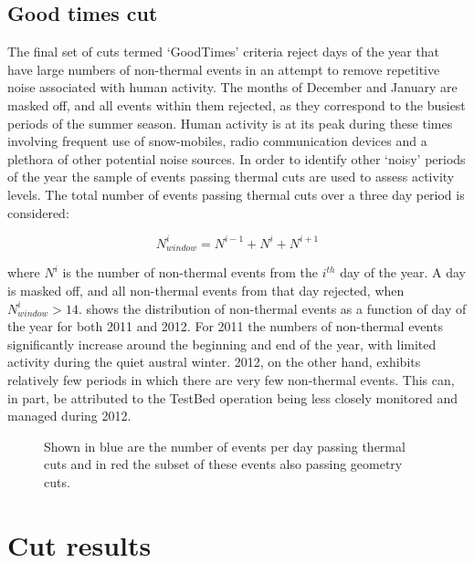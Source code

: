 \subsection{Good times cut}
\label{sec:Analysis:Anthroprogenic-Cuts:Good-Times}
The final set of cuts termed `GoodTimes' criteria reject days of the year that have large numbers of non-thermal events in an attempt to remove repetitive noise associated with human activity. The months of December and January are masked off, and all events within them rejected, as they correspond to the busiest periods of the summer season. Human activity is at its peak during these times involving frequent use of snow-mobiles, radio communication devices and a plethora of other potential noise sources. In order to identify other `noisy' periods of the year the sample of events passing thermal cuts are used to assess activity levels. The total number of events passing thermal cuts over a three day period is considered:

\begin{equation}
  N^{i}_{window} = N^{i-1} + N^{i} + N^{i+1}
\end{equation}

\noindent where $N^{i}$ is the number of non-thermal events from the $i^{th}$ day of the year. A day is masked off, and all non-thermal events from that day rejected, when $N^{i}_{window} > 14$.  shows the distribution of non-thermal events as a function of day of the year for both 2011 and 2012. For 2011 the numbers of non-thermal events significantly increase around the beginning and end of the year, with limited activity during the quiet austral winter. 2012, on the other hand, exhibits relatively few periods in which there are very few non-thermal events. This can, in part, be attributed to the TestBed operation being less closely monitored and managed during 2012.

\begin{figure}[htpb]
\hfill
{}
\caption{Shown in blue are the number of events per day passing thermal cuts and in red the subset of these events also passing geometry cuts.}
\label{fig:Analysis:Anthroprogenic-Cuts:GoodTimes:Event-Rate}
\end{figure}

\section{Cut results}
\label{sec:Analysis:Cut-Results}

